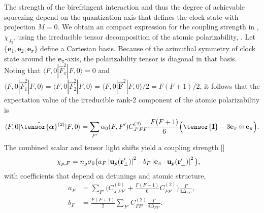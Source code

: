 \documentclass[preprint,aps,pra,onecolumn]{revtex4-1} %
\newcommand{\poltens}{\hat{\tensor{\boldsymbol{\alpha}}}}
\newcommand{\unittens}{\tensor{\mathbf{I}}}
\newcommand{\qaxis}{\mathbf{e}_\pi}
\newcommand{\error}[1]{{\color{red} #1}}
\begin{document}
The strength of the birefringent interaction and thus the degree of achievable squeezing depend on the quantization axis that defines the clock state with projection $M=0$.  We obtain an compact expression for the coupling strength in , $\chi_{J_3}$, using the irreducible tensor decomposition of the atomic polarizability, .  Let $\{\mathbf{e}_1,\mathbf{e}_2, \mathbf{e}_\pi\}$ define a Cartesian basis.  Because of the azimuthal symmetry of clock state around the $\qaxis$-axis, the polarizability tensor is diagonal in that basis.  Noting that $\langle F,0 | \hat{F}_{\pi}^2| F,0 \rangle =0$ and $\langle F,0 | \hat{F}_{1}^2| F,0 \rangle = \langle F,0 | \hat{F}_{2}^2| F,0 \rangle = \langle F,0 | \hat{\mathbf{F}}^2| F,0 \rangle /2 =F(F+1)/2$, it follows that the expectation value of the irreducible rank-2 component of the atomic polarizability is
	\begin{align} \label{Eq::CouplingAngleMagic}
		\langle F,0 | \poltens \phantom{}^{(2)}| F,0 \rangle  %
		= \sum_{F'} \alpha_0(F,F') C^{(2)}_{J'FF'} \frac{F(F+1)}{6} \Big( \unittens - 3\qaxis \otimes \qaxis \Big).
	\end{align}
The combined scalar and tensor light shifts yield a coupling strength []
	\begin{align}
		\chi_{p,F} %
		&  = n_g \sigma_0 \big(  a_{F} \left|\mathbf{u}_p(\br'_\perp)\right|^2 \error{-} b_{F} \left|\mathbf{e}_\pi \cdot \mathbf{u}_p(\br'_\perp)\right|^2 \big), \label{Eq::ClockStateCoupling}
	\end{align}
with coefficients that depend on detunings and atomic structure,
	\begin{align}
		a_F &= \sum_{F'}  \Big(C^{(0)}_{J'FF'} + \frac{F(F+1)}{6} C^{(2)}_{FF'} \Big) \frac{\Gamma}{4 \Delta_{FF'}},\\
		b_F &= \frac{F(F+1)}{2}\sum_{F'} C^{(2)}_{FF'}  \frac{\Gamma}{4 \Delta_{FF'}}.
	\end{align}
\end{document}
